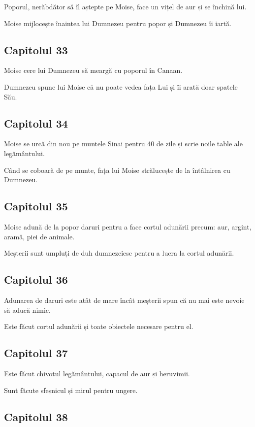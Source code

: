 \documentclass[12pt,a4paper]{article}
\begin{document}
Poporul, nerăbdător să îl aștepte pe Moise, face un vițel de aur și se închină lui.

Moise mijlocește înaintea lui Dumnezeu pentru popor și Dumnezeu îi iartă.

\subsection{Capitolul 33}

Moise cere lui Dumnezeu să meargă cu poporul în Canaan.

Dumnezeu spune lui Moise că nu poate vedea fața Lui și îi arată doar spatele Său.

\subsection{Capitolul 34}

Moise se urcă din nou pe muntele Sinai pentru 40 de zile și scrie noile table ale legământului.

Când se coboară de pe munte, fața lui Moise strălucește de la întâlnirea cu Dumnezeu.

\subsection{Capitolul 35}

Moise adună de la popor daruri pentru a face cortul adunării precum: aur, argint, aramă, piei de animale.

Meșterii sunt umpluți de duh dumnezeiesc pentru a lucra la cortul adunării.

\subsection{Capitolul 36}

Adunarea de daruri este atât de mare încât meșterii spun că nu mai este nevoie să aducă nimic.

Este făcut cortul adunării și toate obiectele necesare pentru el.

\subsection{Capitolul 37}

Este făcut chivotul legământului, capacul de aur și heruvimii.

Sunt făcute sfeșnicul și mirul pentru ungere.

\subsection{Capitolul 38}
\end{document}
